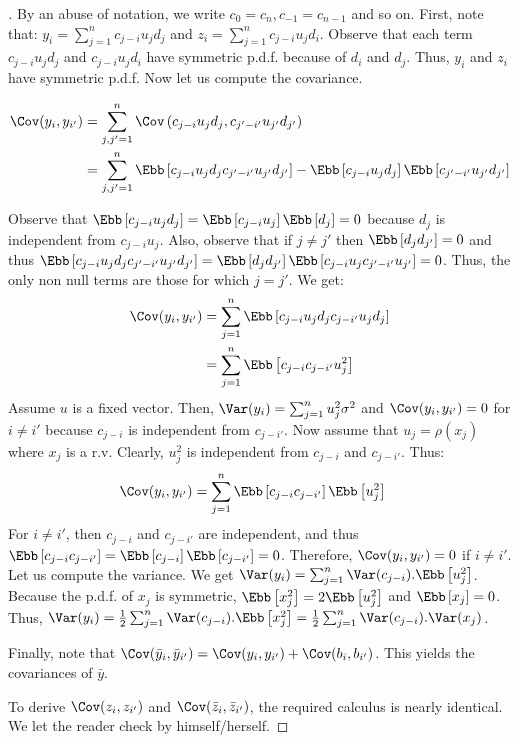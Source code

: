 \begin{proof}[]
By an abuse of notation, we write $c_{0}=c_{n},c_{-1}=c_{n-1}$ and so on.
First, note that: $y_{i}=\sum_{j=1}^{n}c_{j-i}u_{j}d_{j}$ and $z_{i}=\sum_{j=1}^{n}c_{j-i}u_{j}d_{i}$.
Observe that each term $c_{j-i}u_{j}d_{j}$ and $c_{j-i}u_{j}d_{i}$ have symmetric p.d.f. because of $d_{i}$ and $d_{j}$.
Thus, $y_{i}$ and $z_{i}$ have symmetric p.d.f. Now let us compute the covariance.

\begin{align}
    \Cov(y_{i},y_{i'}) &= \sum_{j,j'=1}^{n} \Cov\left(c_{j-i}u_{j}d_{j},c_{j'-i'}u_{j'}d_{j'}\right) \\
        &= \sum_{j,j'=1}^{n}\Ebb\left[c_{j-i}u_{j}d_{j}c_{j'-i'}u_{j'}d_{j'}\right] - \Ebb\left[c_{j-i}u_{j}d_{j}\right] \Ebb\left[ c_{j'-i'}u_{j'}d_{j'} \right]
\end{align}

Observe that $\Ebb\left[c_{j-i}u_{j}d_{j}\right]=\Ebb\left[c_{j-i}u_{j}\right]\Ebb\left[d_{j}\right]=0$ because $d_{j}$ is independent from $c_{j-i}u_{j}$.
Also, observe that if $j\neq j'$ then $\Ebb\left[d_{j}d_{j'}\right]=0$ and thus $\Ebb\left[c_{j-i}u_{j}d_{j}c_{j'-i'}u_{j'}d_{j'}\right]=\Ebb\left[d_{j}d_{j'}\right]\Ebb\left[c_{j-i}u_{j}c_{j'-i'}u_{j'}\right]=0$.
Thus, the only non null terms are those for which $j=j'$. We get:
\begin{align*}
  \Cov(y_{i},y_{i'}) & =\sum_{j=1}^{n}\Ebb\left[c_{j-i}u_{j}d_{j}c_{j-i'}u_{j}d_{j}\right] \\
   & =\sum_{j=1}^{n}\Ebb\left[c_{j-i}c_{j-i'}u_{j}^{2}\right]
\end{align*}
Assume $u$ is a fixed vector. Then, $\Var(y_{i})=\sum_{j=1}^{n}u_{j}^{2}\sigma^{2}$ and $\Cov(y_{i},y_{i'})=0$ for $i\neq i'$ because $c_{j-i}$ is independent from $c_{j-i'}$.
Now assume that $u_{j} = \rho(x_{j})$ where $x_{j}$ is a r.v. Clearly, $u_{j}^{2}$ is independent from $c_{j-i}$ and $c_{j-i'}$. Thus:
\begin{align*}
  \Cov(y_{i},y_{i'}) & =\sum_{j=1}^{n}\Ebb \left[ c_{j-i}c_{j-i'}\right] \Ebb\left[ u_{j}^{2} \right]
\end{align*}
For $i\neq i'$, then $c_{j-i}$ and $c_{j-i'}$ are independent, and thus $\Ebb\left[c_{j-i}c_{j-i'}\right]=\Ebb\left[c_{j-i}\right]\Ebb\left[c_{j-i'}\right]=0$.
Therefore, $\Cov(y_{i},y_{i'}) = 0$ if $i \neq i'$.
Let us compute the variance.
We get $\Var(y_{i})=\sum_{j=1}^{n} \Var(c_{j-i}).\Ebb\left[u_{j}^{2}\right]$.
Because the p.d.f. of $x_{j}$ is symmetric, $\Ebb\left[x_{j}^{2}\right]=2\Ebb\left[u_{j}^{2}\right]$ and $\Ebb\left[x_{j}\right]=0$.
Thus, $\Var(y_{i})=\frac{1}{2}\sum_{j=1}^{n} \Var(c_{j-i}).
\Ebb\left[x_{j}^{2}\right]=\frac{1}{2}\sum_{j=1}^{n} \Var(c_{j-i}).\Var(x_{j})$.

Finally, note that $\Cov (\bar{y}_{i},\bar{y}_{i'}) = \Cov( y_{i},y_{i'} ) + \Cov( b_{i},b_{i'} )$. This yields the covariances of $\bar{y}$.

To derive $\Cov(z_{i},z_{i'})$ and $\Cov(\bar{z}_{i},\bar{z}_{i'})$, the required calculus is nearly identical. We let the reader check by himself/herself.
\end{proof}


